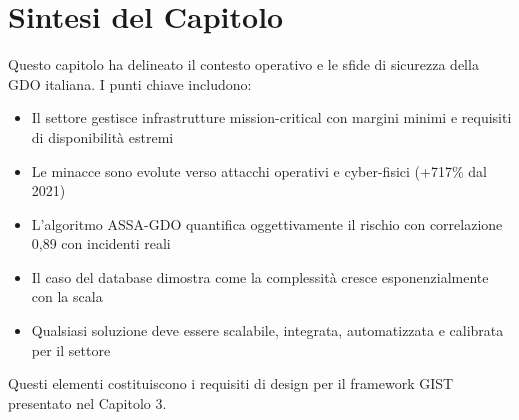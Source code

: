 \section{Sintesi del Capitolo}
\label{sec:sintesi_cap2}

Questo capitolo ha delineato il contesto operativo e le sfide di sicurezza della GDO italiana. I punti chiave includono:

\begin{itemize}
\item Il settore gestisce infrastrutture mission-critical con margini minimi e requisiti di disponibilità estremi
\item Le minacce sono evolute verso attacchi operativi e cyber-fisici (+717\% dal 2021)
\item L'algoritmo ASSA-GDO quantifica oggettivamente il rischio con correlazione 0,89 con incidenti reali
\item Il caso del database dimostra come la complessità cresce esponenzialmente con la scala
\item Qualsiasi soluzione deve essere scalabile, integrata, automatizzata e calibrata per il settore
\end{itemize}

Questi elementi costituiscono i requisiti di design per il framework GIST presentato nel Capitolo 3.